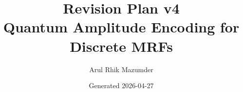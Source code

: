%
%

\documentclass[11pt]{article}
\usepackage[margin=1in]{geometry}
\usepackage{verbatim}
\usepackage{enumitem}
\usepackage{hyperref}
\usepackage{xcolor}
\usepackage{amsmath,amssymb}
\usepackage{booktabs}

\newcommand{\DONE}{{\color{teal}\textbf{[DONE]}}}
\newcommand{\PEND}{{\color{orange}\textbf{[PENDING-EXPERIMENT]}}}
\newcommand{\TODO}[1]{{\color{red}\textbf{TODO:} #1}}

\title{Revision Plan v4 \\ \large Quantum Amplitude Encoding for Discrete MRFs}
\author{Arul Rhik Mazumder}
\date{Generated 2026-04-27}


\maketitle

\section{Reviewer-Concern $\to$ Fix Map}

